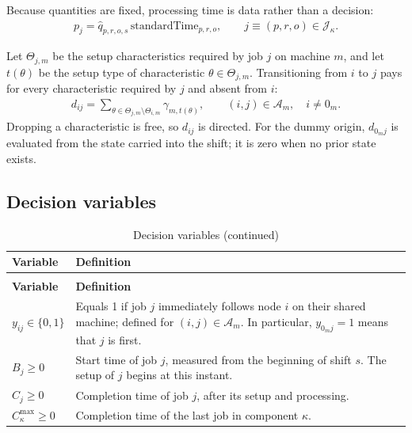 \documentclass{article}
\begin{document}
Because quantities are fixed, processing time is data rather than a decision:
\begin{align}
p_j
=
\hat{q}_{p,r,o,s}\,\text{standardTime}_{p,r,o},
\qquad j\equiv(p,r,o)\in\mathcal{J}_{\kappa}.
\label{eq:processing-time}
\end{align}

Let $\Theta_{j,m}$ be the setup characteristics required by job $j$ on machine
$m$, and let $t(\theta)$ be the setup type of characteristic
$\theta\in\Theta_{j,m}$. Transitioning from $i$ to $j$ pays for every
characteristic required by $j$ and absent from $i$:
\begin{align}
d_{ij}
=
\sum_{\theta\in\Theta_{j,m}\setminus\Theta_{i,m}}
\gamma_{m,t(\theta)},
\qquad (i,j)\in\mathcal{A}_{m},\quad i\neq 0_m.
\label{eq:setup-distance}
\end{align}
Dropping a characteristic is free, so $d_{ij}$ is directed. For the dummy
origin, $d_{0_mj}$ is evaluated from the state carried into the shift; it is
zero when no prior state exists.

\subsection{Decision variables}

\begingroup
\small
\setlength{\LTleft}{0pt}
\setlength{\LTright}{0pt}
\setlength{\tabcolsep}{4pt}
\renewcommand{\arraystretch}{1.15}

\begin{longtable}{@{}L{0.30\textwidth}L{0.64\textwidth}@{}}
\caption{Decision variables}
\label{tab:seq-decision-variables} \\

\toprule
\textbf{Variable} & \textbf{Definition} \\
\midrule
\endfirsthead

\caption[]{Decision variables (continued)} \\
\toprule
\textbf{Variable} & \textbf{Definition} \\
\midrule
\endhead

\bottomrule
\endlastfoot

$y_{ij}\in\{0,1\}$ & Equals 1 if job $j$ immediately follows node $i$ on their shared machine; defined for $(i,j)\in\mathcal{A}_{m}$. In particular, $y_{0_mj}=1$ means that $j$ is first. \\

$B_j\geq0$ & Start time of job $j$, measured from the beginning of shift $s$. The setup of $j$ begins at this instant. \\

$C_j\geq0$ & Completion time of job $j$, after its setup and processing. \\

$C^{\max}_{\kappa}\geq0$ & Completion time of the last job in component $\kappa$. \\

\end{longtable}
\endgroup
\end{document}
